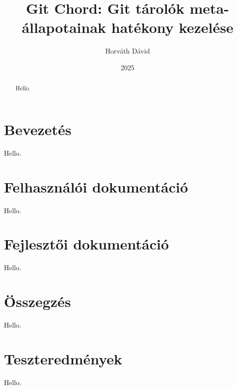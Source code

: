 \documentclass[final]{elteikthesis}[2025/03/25]
\title{Git Chord: Git tárolók meta-állapotainak hatékony kezelése}
\date{2025}
\author{Horváth Dávid}
\affiliation{egyetemi adjunktus}
\begin{document}

\listoftodos
\cleardoublepage

\maketitle

%

\begin{abstract}
Hello.
\end{abstract}

\tableofcontents
\cleardoublepage

\chapter{Bevezetés}
\label{ch:intro}

Hello.

\cleardoublepage

\chapter{Felhasználói dokumentáció}
\label{ch:user}

Hello.

\cleardoublepage

\chapter{Fejlesztői dokumentáció}
\label{ch:impl}

Hello.

\cleardoublepage

\chapter{Összegzés}
\label{ch:sum}

Hello.

\cleardoublepage

\appendix

\chapter{Teszteredmények}
\label{appx:test}

Hello.

\cleardoublepage

{}
\printbibliography[title=\biblabel]
\cleardoublepage

{}
\listoffigures
\cleardoublepage

{}
\listoftables
\cleardoublepage

{}
\listofalgorithms
\cleardoublepage

{}
\lstlistoflistings
\cleardoublepage
\end{document}
